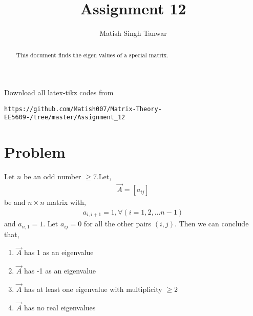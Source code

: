 \documentclass[journal,12pt,twocolumn]{IEEEtran}
\begin{document}
 \vspace{3cm}
 \title{Assignment 12}
 \author{Matish Singh Tanwar}
 \maketitle
 \newpage
 \bigskip
 \renewcommand{\thetable}{\theenumi}
\vspace{1.0cm}
\begin{abstract}
This document finds the eigen values of a special matrix.
\end{abstract}
\vspace{0.5cm}
%
Download all latex-tikz codes from 
\begin{lstlisting}
https://github.com/Matish007/Matrix-Theory-EE5609-/tree/master/Assignment_12
\end{lstlisting}
%
%
\vspace{0.5mm}
\section{Problem}
Let $n$ be an odd number $\geq7$.Let,
\begin{align}
\vec{A}=[a_{ij}]
\end{align}
be and $n \times n$ matrix with,
\begin{align}
   a_{i,i+1}=1, \forall (i=1,2,...n-1)
\end{align}
and $a_{n,1}=1$. Let $a_{ij}=0$ for all the other pairs $(i,j)$. Then we can conclude that,
\begin{enumerate}
\item{$\vec{A}$ has 1 as an eigenvalue}
\item{$\vec{A}$ has -1 as an eigenvalue}
\item{$\vec{A}$ has at least one eigenvalue with multiplicity $\geq2$}
\item{$\vec{A}$ has no real eigenvalues}
\end{enumerate}
\end{document}
